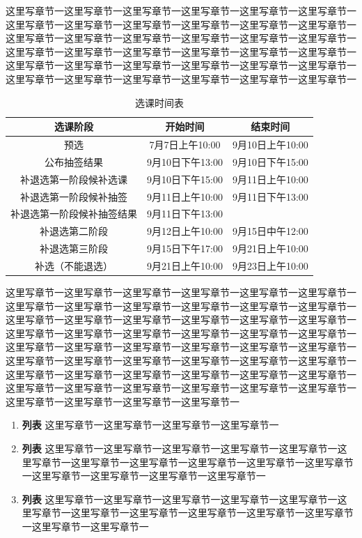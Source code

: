 \documentclass[UTF8,12pt,a4paper]{ctexart}
\begin{document}
这里写章节一这里写章节一这里写章节一这里写章节一这里写章节一这里写章节一这里写章节一这里写章节一这里写章节一这里写章节一这里写章节一这里写章节一这里写章节一这里写章节一这里写章节一这里写章节一这里写章节一这里写章节一这里写章节一这里写章节一这里写章节一这里写章节一这里写章节一这里写章节一这里写章节一这里写章节一这里写章节一这里写章节一这里写章节一这里写章节一这里写章节一这里写章节一这里写章节一这里写章节一这里写章节一这里写章节一

\begin{table}[h]
		\renewcommand\arraystretch{1.2}
		\centering
	\begin{tabular}{@{}ccc@{}}
		\toprule
		\textbf{选课阶段}               & \textbf{开始时间}         & \textbf{结束时间}        \\ \midrule
		预选                 & 7月7日上午10:00  & 9月10日上午10:00 \\
		公布抽签结果             & 9月10日下午13:00 & 9月10日下午15:00 \\
		补退选第一阶段候补选课        & 9月10日下午15:00 & 9月11日上午10:00 \\
		补退选第一阶段候补抽签        & 9月11日上午10:00 & 9月11日下午13:00 \\
		补退选第一阶段候补抽签结果      & 9月11日下午13:00 &              \\
		补退选第二阶段      & 9月12日上午10:00 & 9月15日中午12:00 \\
		补退选第三阶段& 9月15日下午17:00 & 9月21日上午10:00 \\
		补选（不能退选）           & 9月21日上午10:00 & 9月23日上午10:00 \\ \bottomrule
	\end{tabular}
	\caption{选课时间表}
\end{table}

这里写章节一这里写章节一这里写章节一这里写章节一这里写章节一这里写章节一这里写章节一这里写章节一这里写章节一这里写章节一这里写章节一这里写章节一这里写章节一这里写章节一这里写章节一这里写章节一这里写章节一这里写章节一这里写章节一这里写章节一这里写章节一这里写章节一这里写章节一这里写章节一这里写章节一这里写章节一这里写章节一这里写章节一这里写章节一这里写章节一这里写章节一这里写章节一这里写章节一这里写章节一这里写章节一这里写章节一这里写章节一这里写章节一这里写章节一这里写章节一这里写章节一这里写章节一这里写章节一这里写章节一这里写章节一这里写章节一这里写章节一这里写章节一这里写章节一这里写章节一这里写章节一这里写章节一
\begin{enumerate}
	\setlength{\parindent}{2em}
	\renewcommand{\labelenumi}{\textbf{\theenumi .}}
	\item{\textbf{列表}}
	这里写章节一这里写章节一这里写章节一这里写章节一
	
	\item{\textbf{列表}}
	这里写章节一这里写章节一这里写章节一这里写章节一这里写章节一这里写章节一这里写章节一这里写章节一这里写章节一这里写章节一这里写章节一这里写章节一这里写章节一这里写章节一这里写章节一
	\item{\textbf{列表}}
	这里写章节一这里写章节一这里写章节一这里写章节一这里写章节一这里写章节一这里写章节一这里写章节一这里写章节一这里写章节一这里写章节一这里写章节一这里写章节一
\end{enumerate}
\end{document}

